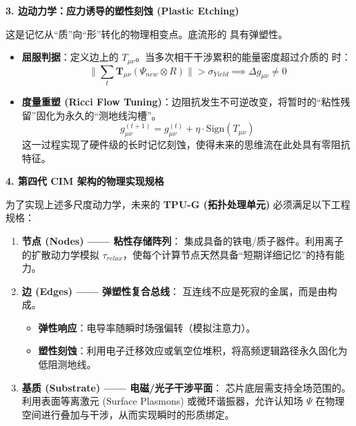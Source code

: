 \textbf{3. 边动力学：应力诱导的塑性刻蚀 (Plastic Etching)}

这是记忆从“质”向“形”转化的物理相变点。底流形的 具有弹塑性。

\begin{itemize}
    \item \textbf{屈服判据}：定义边上的 $T_{\mu\nu}$。当多次相干干涉累积的能量密度超过介质的 时：
    \begin{equation}
        \| \sum_{t} \mathbf{T}_{\mu\nu}(\Psi_{new} \otimes R) \| > \sigma_{Yield} \implies \Delta g_{\mu\nu} \neq 0
    \end{equation}

    \item \textbf{度量重塑 (Ricci Flow Tuning)}：边阻抗发生不可逆改变，将暂时的“粘性残留”固化为永久的“测地线沟槽”。
    \begin{equation}
        g_{\mu\nu}^{(t+1)} = g_{\mu\nu}^{(t)} + \eta \cdot \text{Sign}(T_{\mu\nu})
    \end{equation}
    这一过程实现了硬件级的长时记忆刻蚀，使得未来的思维流在此处具有零阻抗特征。
\end{itemize}

\textbf{4. 第四代 CIM 架构的物理实现规格}

为了实现上述多尺度动力学，未来的 \textbf{TPU-G (拓扑处理单元)} 必须满足以下工程规格：

\begin{enumerate}
    \item \textbf{节点 (Nodes) —— 粘性存储阵列}：
    集成具备的铁电/质子器件。利用离子的扩散动力学模拟 $\tau_{relax}$，使每个计算节点天然具备“短期详细记忆”的持有能力。

    \item \textbf{边 (Edges) —— 弹塑性复合总线}：
    互连线不应是死寂的金属，而是由构成。
    \begin{itemize}
        \item \textbf{弹性响应}：电导率随瞬时场强偏转（模拟注意力）。
        \item \textbf{塑性刻蚀}：利用电子迁移效应或氧空位堆积，将高频逻辑路径永久固化为低阻测地线。
    \end{itemize}

    \item \textbf{基质 (Substrate) —— 电磁/光子干涉平面}：
    芯片底层需支持全场范围的。利用表面等离激元 (Surface Plasmons) 或微环谐振器，允许认知场 $\Psi$ 在物理空间进行叠加与干涉，从而实现瞬时的形质绑定。
\end{enumerate}

